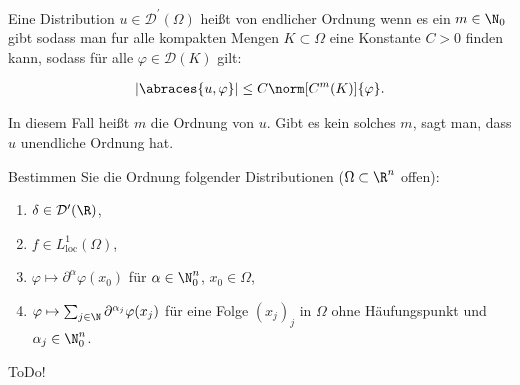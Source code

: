 
\begin{exercise}

Eine Distribution $u \in \mathcal{D}^\prime(\Omega)$ heißt von endlicher Ordnung wenn es ein $m \in \N_0$ gibt sodass man fur alle kompakten Mengen $K \subset \Omega$ eine Konstante $C > 0$ finden kann, sodass für alle $\varphi \in \mathcal{D}(K)$ gilt:

\begin{align*}
    |\abraces{u, \varphi}|
    \leq
    C \norm[C^m(K)]{\varphi}.
\end{align*}

In diesem Fall heißt $m$ die Ordnung von $u$.
Gibt es kein solches $m$, sagt man, dass $u$ unendliche Ordnung hat.

Bestimmen Sie die Ordnung folgender Distributionen ($\Omega \subset \R^n$ offen):

\begin{enumerate}[label = (\roman*)]
    \item $\delta \in \mathcal{D}^\prime(\R)$,
    \item $f \in L^1_{\text{loc}}(\Omega)$,
    \item $\varphi \mapsto \partial^\alpha \varphi(x_0)$ für $\alpha \in \N_0^n$, $x_0 \in \Omega$,
    \item $\varphi \mapsto \sum_{j \in \N} \partial^{\alpha_j} \varphi(x_j)$ für eine Folge $(x_j)_j$ in $\Omega$ ohne Häufungspunkt und $\alpha_j \in \N_0^n$.
\end{enumerate}

\end{exercise}


\begin{solution}

ToDo!

\end{solution}

